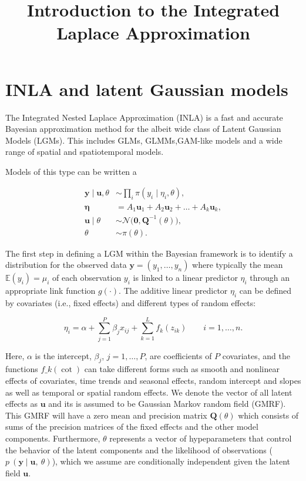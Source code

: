 \documentclass[
  letterpaper,
  DIV=11,
  numbers=noendperiod]{scrartcl}
\title{Introduction to the Integrated Laplace Approximation}
\author{}
\date{}
\makeatletter
\renewcommand{\maketitle}{\bgroup\setlength{\parindent}{0pt}
\begin{flushleft}
  {\sffamily\huge\textbf{\MakeUppercase{\@title}}} \vspace{0.3cm} \newline
  {\Large {\@subtitle}} \newline
  \@author
\end{flushleft}\egroup
}
\makeatother
\begin{document}
\maketitle

\pagestyle{mystyle}


\section{INLA and latent Gaussian
models}\label{inla-and-latent-gaussian-models}

The Integrated Nested Laplace Approximation (INLA) is a fast and
accurate Bayesian approximation method for the albeit wide class of
Latent Gaussian Models (LGMs). This includes GLMs, GLMMs,GAM-like models
and a wide range of spatial and spatiotemporal models.

Models of this type can be written a

\[
\begin{aligned}
\mathbf{y} \mid \mathbf{u}, \theta 
&\sim \prod_i \pi(y_i \mid \eta_i, \theta), \\[6pt]
\boldsymbol{\eta} 
&= A_1 \mathbf{u}_1 + A_2 \mathbf{u}_2 + \dots + A_k \mathbf{u}_k, \\[6pt]
\mathbf{u} \mid \theta 
&\sim \mathcal{N}\big(\mathbf{0}, \mathbf{Q}^{-1}(\theta)\big), \\[6pt]
\theta 
&\sim \pi(\theta).
\end{aligned}
\]

The first step in defining a LGM within the Bayesian framework is to
identify a distribution for the observed data
\(\mathbf{y} = (y_1, \dots, y_n)\) where typically the mean
\(\mathbb{E}(y_i) = \mu_i\) of each observation \(y_i\) is linked to a
linear predictor \(\eta_i\) through an appropriate link function
\(g(\cdot)\). The additive linear predictor \(\eta_i\) can be defined by
covariates (i.e., fixed effects) and different types of random effects:

\[
\eta_i = \alpha + \sum_{j=1}^{P} \beta_j x_{ij} + \sum_{k=1}^{L} f_{k}(z_{ik})  \qquad i = 1, \dots, n.
\]

Here, \(\alpha\) is the intercept, \(\beta_j\), \(j = 1, \dots, P\), are
coefficients of \(P\) covariates, and the functions \(f\_{k}(\cot)\) can
take different forms such as smooth and nonlinear effects of covariates,
time trends and seasonal effects, random intercept and slopes as well as
temporal or spatial random effects. We denote the vector of all latent
effects as \(\mathbf{u}\) and its is assumed to be Gaussian Markov
random field (GMRF). This GMRF will have a zero mean and precision
matrix \(\mathbf{Q}(\theta)\) which consists of sums of the precision
matrices of the fixed effects and the other model components.
Furthermore, \(\theta\) represents a vector of hypeparameters that
control the behavior of the latent components and the likelihood of
observations (\(p~(\mathbf{y} \mid \mathbf{u},~ \theta)\)), which we
assume are conditionally independent given the latent field
\(\mathbf{u}\).
\end{document}
